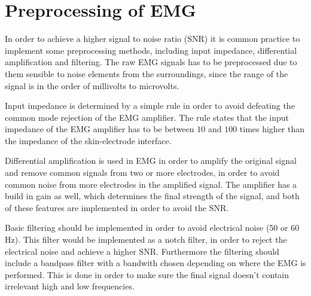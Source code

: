 \section{Preprocessing of EMG}

In order to achieve a higher signal to noise ratio (SNR) it is common practice to implement some preprocessing methods, including input impedance, differential amplification and filtering. The raw EMG signals has to be preprocessed due to them sensible to noise elements from the surroundings, since the range of the signal is in the order of millivolts to microvolts.\cite{cram2012}

Input impedance is determined by a simple rule in order to avoid defeating the common mode rejection of the EMG amplifier. The rule states that the input impedance of the EMG amplifier has to be between $10$ and $100$ times higher than the impedance of the skin-electrode interface.\cite{cram2012}

Differential amplification is used in EMG in order to amplify the original signal and remove common signals from two or more electrodes, in order to avoid common noise from more electrodes in the amplified signal. The amplifier has a build in gain as well, which determines the final strength of the signal, and both of these features are implemented in order to avoid the SNR.\cite{cram2012}

Basic filtering should be implemented in order to avoid electrical noise (50 or 60 Hz). This filter would be implemented as a notch filter, in order to reject the electrical noise and achieve a higher SNR. Furthermore the filtering should include a bandpass filter with a bandwith chosen depending on where the EMG is performed. This is done in order to make sure the final signal doesn't contain irrelevant high and low frequencies.\cite{cram2012}